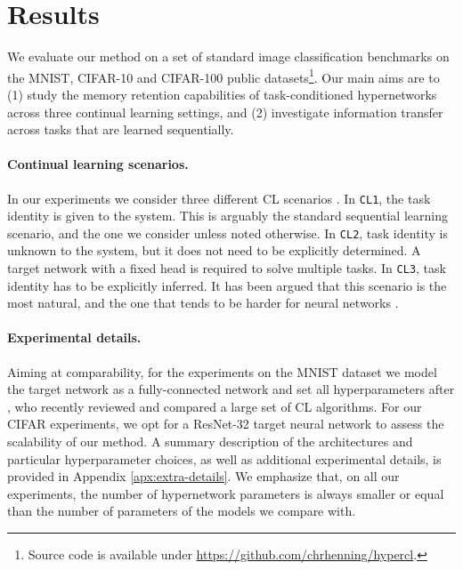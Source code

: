 \documentclass{article}
\begin{document}
\section{Results}

We evaluate our method on a set of standard image classification benchmarks on the MNIST, CIFAR-10 and CIFAR-100 public datasets\footnote{Source code is available under
\href{https://github.com/chrhenning/hypercl}{https://github.com/chrhenning/hypercl}.}. Our main aims are to (1) study the memory retention capabilities of task-conditioned hypernetworks across three continual learning settings, and (2) investigate information transfer across tasks that are learned sequentially.

\vspace{-2mm}
\paragraph{Continual learning scenarios.} In our experiments we consider three different CL scenarios \citep{van_de_ven_three_2019}. In \texttt{CL1}, the task identity is given to the system. This is arguably the standard sequential learning scenario, and the one we consider unless noted otherwise.  In \texttt{CL2}, task identity is unknown to the system, but it does not need to be explicitly determined. A target network with a fixed head is required to solve multiple tasks. In \texttt{CL3}, task identity has to be explicitly inferred. It has been argued that this scenario is the most natural, and the one that tends to be harder for neural networks \citep{farquhar_towards_2018,van_de_ven_three_2019}.

\vspace{-2mm}
\paragraph{Experimental details.} Aiming at comparability, for the experiments on the MNIST dataset we model the target network as a fully-connected network and set all hyperparameters after \citet{van_de_ven_three_2019}, who recently reviewed and compared a large set of CL algorithms. For our CIFAR experiments, we opt for a ResNet-32 target neural network \citep{resnet} to assess the scalability of our method. A summary description of the architectures and particular hyperparameter choices, as well as additional experimental details, is provided in Appendix \ref{apx:extra-details}. We emphasize that, on all our experiments, the number of hypernetwork parameters is always smaller or equal than the number of parameters of the models we compare with.
\end{document}
